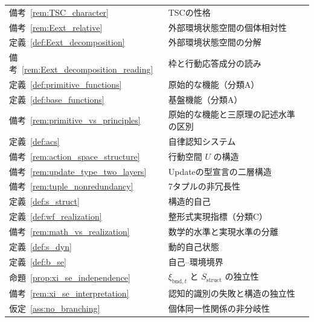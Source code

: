 \begingroup
\small
\setlength{\tabcolsep}{4pt}
\renewcommand{\arraystretch}{1.12}
\begin{longtable}{p{2.4cm} p{10.4cm} r}
備考~\ref{rem:TSC_character} & TSCの性格 & \pageref{rem:TSC_character} \\
備考~\ref{rem:Eext_relative} & 外部環境状態空間の個体相対性 & \pageref{rem:Eext_relative} \\
定義~\ref{def:Eext_decomposition} & 外部環境状態空間の分解 & \pageref{def:Eext_decomposition} \\
備考~\ref{rem:Eext_decomposition_reading} & 枠と行動応答成分の読み & \pageref{rem:Eext_decomposition_reading} \\
定義~\ref{def:primitive_functions} & 原始的な機能（分類A） & \pageref{def:primitive_functions} \\
定義~\ref{def:base_functions} & 基盤機能（分類A） & \pageref{def:base_functions} \\
備考~\ref{rem:primitive_vs_principles} & 原始的な機能と三原理の記述水準の区別 & \pageref{rem:primitive_vs_principles} \\
定義~\ref{def:acs} & 自律認知システム & \pageref{def:acs} \\
備考~\ref{rem:action_space_structure} & 行動空間 $U$ の構造 & \pageref{rem:action_space_structure} \\
備考~\ref{rem:update_type_two_layers} & Updateの型宣言の二層構造 & \pageref{rem:update_type_two_layers} \\
備考~\ref{rem:tuple_nonredundancy} & 7タプルの非冗長性 & \pageref{rem:tuple_nonredundancy} \\
定義~\ref{def:s_struct} & 構造的自己 & \pageref{def:s_struct} \\
定義~\ref{def:wf_realization} & 整形式実現指標（分類C） & \pageref{def:wf_realization} \\
備考~\ref{rem:math_vs_realization} & 数学的水準と実現水準の分離 & \pageref{rem:math_vs_realization} \\
定義~\ref{def:s_dyn} & 動的自己状態 & \pageref{def:s_dyn} \\
定義~\ref{def:b_se} & 自己--環境境界 & \pageref{def:b_se} \\
命題~\ref{prop:xi_se_independence} & $\xi_{\mathrm{bnd},t}$ と $S_{\mathrm{struct}}$ の独立性 & \pageref{prop:xi_se_independence} \\
備考~\ref{rem:xi_se_interpretation} & 認知的識別の失敗と構造の独立性 & \pageref{rem:xi_se_interpretation} \\
仮定~\ref{ass:no_branching} & 個体同一性関係の非分岐性 & \pageref{ass:no_branching} \\

\end{longtable}
